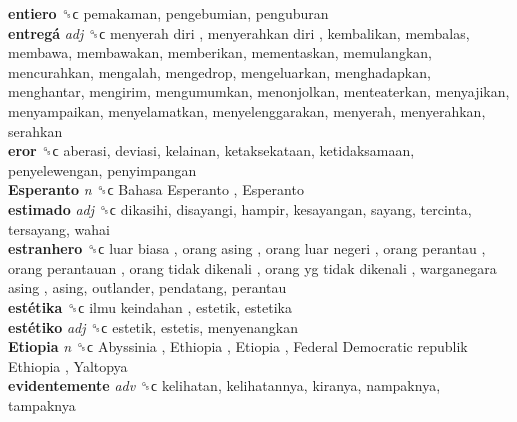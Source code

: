 \textbf{entiero} ␝ϲ  pemakaman, pengebumian, penguburan  \\
\textbf{entregá} \emph{adj}  ␝ϲ   menyerah diri ,  menyerahkan diri , kembalikan, membalas, membawa, membawakan, memberikan, mementaskan, memulangkan, mencurahkan, mengalah, mengedrop, mengeluarkan, menghadapkan, menghantar, mengirim, mengumumkan, menonjolkan, menteaterkan, menyajikan, menyampaikan, menyelamatkan, menyelenggarakan, menyerah, menyerahkan, serahkan  \\
\textbf{eror} ␝ϲ  aberasi, deviasi, kelainan, ketaksekataan, ketidaksamaan, penyelewengan, penyimpangan  \\
\textbf{Esperanto} \emph{n}  ␝ϲ   Bahasa Esperanto ,  Esperanto   \\
\textbf{estimado} \emph{adj}  ␝ϲ  dikasihi, disayangi, hampir, kesayangan, sayang, tercinta, tersayang, wahai  \\
\textbf{estranhero} ␝ϲ   luar biasa ,  orang asing ,  orang luar negeri ,  orang perantau ,  orang perantauan ,  orang tidak dikenali ,  orang yg tidak dikenali ,  warganegara asing , asing, outlander, pendatang, perantau  \\
\textbf{estétika} ␝ϲ   ilmu keindahan , estetik, estetika  \\
\textbf{estétiko} \emph{adj}  ␝ϲ  estetik, estetis, menyenangkan  \\
\textbf{Etiopia} \emph{n}  ␝ϲ   Abyssinia ,  Ethiopia ,  Etiopia ,  Federal Democratic republik Ethiopia ,  Yaltopya   \\
\textbf{evidentemente} \emph{adv}  ␝ϲ  kelihatan, kelihatannya, kiranya, nampaknya, tampaknya  \\
